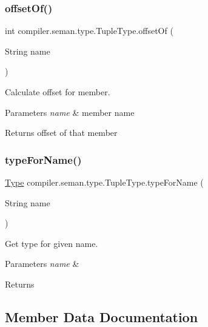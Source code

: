 \subsubsection{\texorpdfstring{offset\+Of()}{offsetOf()}}
{\footnotesize\ttfamily int compiler.\+seman.\+type.\+Tuple\+Type.\+offset\+Of (\begin{DoxyParamCaption}\item[{String}]{name }\end{DoxyParamCaption})}

Calculate offset for member. 
\begin{DoxyParams}{Parameters}
{\em name} & member name \\
\hline
\end{DoxyParams}
\begin{DoxyReturn}{Returns}
offset of that member 
\end{DoxyReturn}
\mbox{\label{classcompiler_1_1seman_1_1type_1_1_tuple_type_ab593e1e75bfbdc89f45736bf07baa2f8}} 
\subsubsection{\texorpdfstring{type\+For\+Name()}{typeForName()}}
{\footnotesize\ttfamily \hyperlink{classcompiler_1_1seman_1_1type_1_1_type}{Type} compiler.\+seman.\+type.\+Tuple\+Type.\+type\+For\+Name (\begin{DoxyParamCaption}\item[{String}]{name }\end{DoxyParamCaption})}

Get type for given name. 
\begin{DoxyParams}{Parameters}
{\em name} & \\
\hline
\end{DoxyParams}
\begin{DoxyReturn}{Returns}

\end{DoxyReturn}


\subsection{Member Data Documentation}
\mbox{\label{classcompiler_1_1seman_1_1type_1_1_tuple_type_a459e333d721e5853a0394cd9778b41f4}} 
